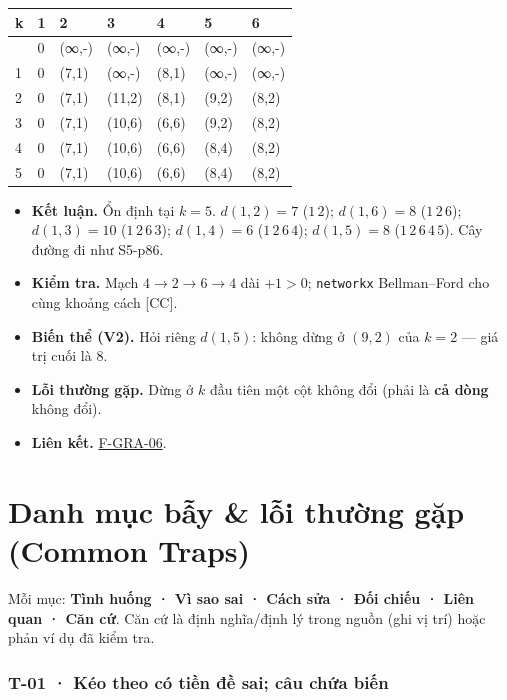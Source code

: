 \documentclass[
  10pt,
  twoside,openany]{book}
\providecommand{\tightlist}{%
  \setlength{\itemsep}{0pt}\setlength{\parskip}{0pt}}
\begin{document}
\begin{longtable}[]{@{}lllllll@{}}
\toprule\noalign{}
k & 1 & 2 & 3 & 4 & 5 & 6 \\
\midrule\noalign{}
\endhead
\bottomrule\noalign{}
\endlastfoot
0 & 0 & (∞,-) & (∞,-) & (∞,-) & (∞,-) & (∞,-) \\
1 & 0 & (7,1) & (∞,-) & (8,1) & (∞,-) & (∞,-) \\
2 & 0 & (7,1) & (11,2) & (8,1) & (9,2) & (8,2) \\
3 & 0 & (7,1) & (10,6) & (6,6) & (9,2) & (8,2) \\
4 & 0 & (7,1) & (10,6) & (6,6) & (8,4) & (8,2) \\
5 & 0 & (7,1) & (10,6) & (6,6) & (8,4) & (8,2) \\
\end{longtable}

\begin{itemize}
\tightlist
\item
  \textbf{Kết luận.} Ổn định tại \(k=5\). \(d(1,2)=7\) (\(1\,2\));
  \(d(1,6)=8\) (\(1\,2\,6\)); \(d(1,3)=10\) (\(1\,2\,6\,3\));
  \(d(1,4)=6\) (\(1\,2\,6\,4\)); \(d(1,5)=8\) (\(1\,2\,6\,4\,5\)). Cây
  đường đi như S5-p86.
\item
  \textbf{Kiểm tra.} Mạch \(4\to2\to6\to4\) dài \(+1>0\);
  \texttt{networkx} Bellman--Ford cho cùng khoảng cách {[}CC{]}.
\item
  \textbf{Biến thể (V2).} Hỏi riêng \(d(1,5)\): không dừng ở \((9,2)\)
  của \(k=2\) --- giá trị cuối là 8.
\item
  \textbf{Lỗi thường gặp.} Dừng ở \(k\) đầu tiên một cột không đổi (phải
  là \textbf{cả dòng} không đổi).
\item
  \textbf{Liên kết.} \protect\hyperlink{F-GRA-06}{F-GRA-06}.
\end{itemize}

\hypertarget{traps}{%
\chapter{Danh mục bẫy \& lỗi thường gặp (Common Traps)}\label{traps}}

Mỗi mục: \textbf{Tình huống · Vì sao sai · Cách sửa · Đối chiếu · Liên
quan · Căn cứ}. Căn cứ là định nghĩa/định lý trong nguồn (ghi vị trí)
hoặc phản ví dụ đã kiểm tra.

\hypertarget{T-01}{%
\subsection{T-01 · Kéo theo có tiền đề sai; câu chứa biến}\label{T-01}}
\end{document}
